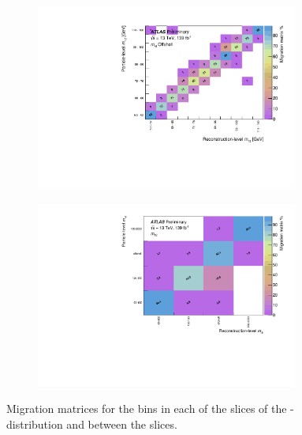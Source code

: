 \begin{figure}[htb]
  \begin{subfigure}{.49\textwidth}\centering\includegraphics[width = 0.95\textwidth]{Figures/m4l/UnfoldingStudies/v014_matrices/m12_m4loffshellMatrix.pdf}\end{subfigure}
 \begin{subfigure}{.49\textwidth}\centering\includegraphics[width = 0.95\textwidth]{Figures/m4l/UnfoldingStudies/v014_matrices/m12_m4lMatrix.pdf}\end{subfigure}
\caption{Migration matrices for the \mZOne bins in each of the \mFourL slices of the \mZOne-\mFourL distribution and between the slices.}
 \end{figure}



